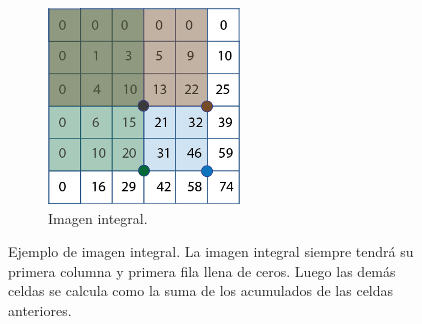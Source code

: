 \documentclass[a4paper,openright,12pt]{report}
\begin{document}
\begin{enumerate}
\begin{figure}[H]
\begin{subfigure}[b]{0.4\textwidth}
        \includegraphics[width=\textwidth]{../images/integral-image-output.png}
        \caption{Imagen integral.}
        \label{fig:integral-image-output}
      \end{subfigure}
      \caption{Ejemplo de imagen integral. La imagen integral siempre tendrá
      su primera columna y primera fila llena de ceros. Luego las demás celdas
      se calcula como la suma de los acumulados de las celdas anteriores.}
    \end{figure}


\end{enumerate}
\end{document}
